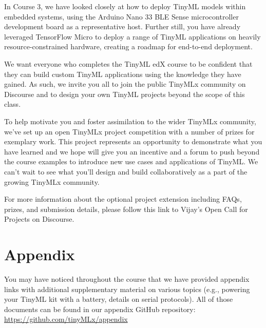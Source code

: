      In Course 3, we have looked closely at how to deploy TinyML models within embedded systems, using the Arduino Nano 33 BLE Sense microcontroller development board as a representative host. Further still, you have already leveraged TensorFlow Micro to deploy a range of TinyML applications on heavily resource-constrained hardware,  creating a roadmap for end-to-end deployment.
     
     We want everyone who completes the TinyML edX course to be confident that they can build custom TinyML applications using the knowledge they have gained. As such, we invite you all to join the public TinyMLx community on Discourse and to design your own TinyML projects beyond the scope of this class. 
     
     To help motivate you and foster assimilation to the wider TinyMLx community, we’ve set up an open TinyMLx project competition with a number of prizes for exemplary work. This project represents an opportunity to demonstrate what you have learned and we hope will give you an incentive and a forum to push beyond the course examples to introduce new use cases and applications of TinyML. We can’t wait to see what you’ll design and build collaboratively as a part of the growing TinyMLx community.
     
     For more information about the optional project extension including FAQs, prizes, and submission details, please follow this link to Vijay’s Open Call for Projects on Discourse.   
     
\section{Appendix}

You may have noticed throughout the course that we have provided appendix links with additional supplementary material on various topics (e.g., powering your TinyML kit with a battery, details on serial protocols). All of those documents can be found in our appendix GitHub repository: \url{https://github.com/tinyMLx/appendix}
